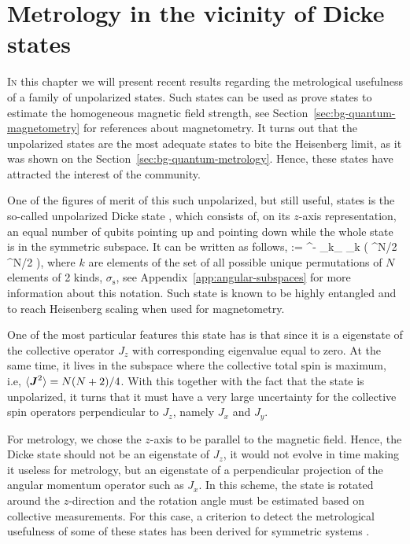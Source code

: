 \section{Metrology in the vicinity of Dicke states}
\label{sec:vd}



\lettrine[lines=2, findent=3pt,nindent=0pt]{I}{n} this chapter we will present recent results regarding the metrological usefulness of a family of unpolarized states.
Such states can be used as prove states to estimate the homogeneous magnetic field strength, see Section~\ref{sec:bg-quantum-magnetometry} for references about magnetometry.
It turns out that the unpolarized states are the most adequate states to bite the Heisenberg limit, as it was shown on the Section~\ref{sec:bg-quantum-metrology}.
Hence, these states have attracted the interest of the community.

One of the figures of merit of this such unpolarized, but still useful, states is the so-called unpolarized Dicke state \citep{Dicke1954}, which consists of, on its $z$-axis  representation, an equal number of qubits pointing up and pointing down while the whole state is in the symmetric subspace.
It can be written as follows,
\be
   \equiv {}:= ^{-}
  \sum_{k\in \sigma_}
  _{k} \left( ^{\otimes N/2} ^{\otimes N/2}
  \right),
  \label{eq:vd-unpolarised-dicke}
\ee
where $k$ are elements of the set of all possible unique permutations of $N$ elements of 2 kinds, $\sigma_\text{s}$, see Appendix~{\ref{app:angular-subspaces}} for more information about this notation.
Such state is known to be highly entangled \citep{} and to reach Heisenberg scaling when used for magnetometry.

One of the most particular features this state has is that since it is a eigenstate of the collective operator $J_z$ with corresponding eigenvalue equal to zero.
At the same time, it lives in the subspace where the collective total spin is maximum, i.e, $\langle \boldsymbol{J}^2 \rangle=N(N+2)/4$.
With this together with the fact that the state is unpolarized, it turns that it must have a very large uncertainty for the collective spin operators perpendicular to $J_z$, namely $J_x$ and $J_y$.

For metrology, we chose the $z$-axis to be parallel to the magnetic field.
Hence, the Dicke state should not be an eigenstate of $J_z$, it would not evolve in time making it useless for metrology, but an eigenstate of a perpendicular projection of the angular momentum operator such as $J_x$.
In this scheme, the state is rotated around the $z$-direction and the rotation angle must be estimated based on collective measurements.
For this case, a criterion to detect the metrological usefulness of some of these states has been derived for symmetric systems \citep{VD51}.

